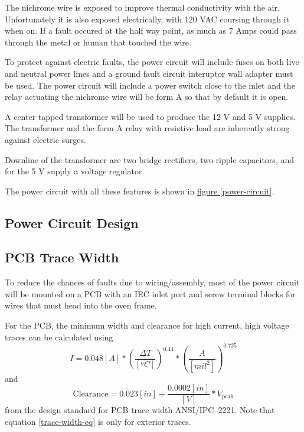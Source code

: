 \documentclass[10pt, twocolumn]{article}
\begin{document}
The nichrome wire is exposed to improve thermal conductivity with the air.
Unfortunately it is also exposed electrically, with 120 VAC coursing through
it when on. If a fault occured at the half way point, as much as 7 Amps could
pass through the metal or human that touched the wire.

To protect against electric faults, the power circuit will include fuses
on both live and neutral power lines and a ground fault circuit interuptor
wall adapter must be used. The power circuit will include a power
switch close to the inlet and the relay actuating the nichrome wire will
be form A so that by default it is open.

A center tapped transformer will be used to produce the 12 V and 5 V supplies.
The transformer and the form A relay with resistive load are
inherently strong against electric surges.

Downline of the transformer are two bridge rectifiers, two ripple capacitors,
and for the 5 V supply a voltage regulator.

The power circuit with all these features is shown in
\hyperref[power-circuit]{figure \ref{power-circuit}}.

\subsection{Power Circuit Design}

\subsection{PCB Trace Width}

To reduce the chances of faults due to wiring/assembly, most of the power
circuit will be mounted on a PCB with an IEC inlet port and screw terminal
blocks for wires that must head into the oven frame.

For the PCB, the minimum width and clearance for high current,
high voltage traces can be calculated using
\begin{equation}
I=0.048[A]*\left(\frac{\Delta T}{[^{o}C]}\right)^{0.44}*\left(\frac{A}{[mil^{2}]}\right)^{0.725}
\label{trace-width-eq}
\end{equation}
and
\begin{equation}
\textrm{Clearance}=0.023[in]+\frac{0.0002[in]}{[V]}*V_{\textrm{peak}}
\end{equation}
from the design standard for PCB trace width ANSI/IPC--2221. Note that
equation \ref{trace-width-eq} is only for exterior traces.
\end{document}
